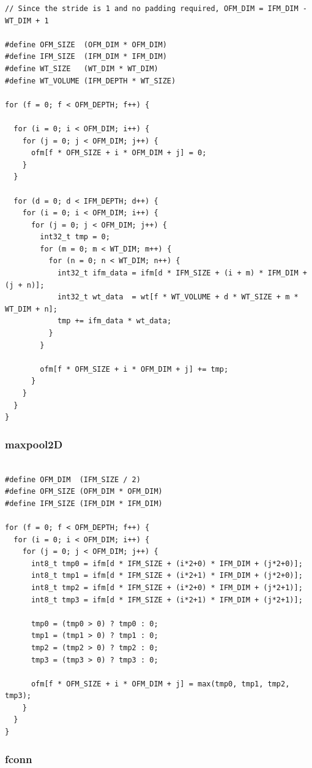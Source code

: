 \documentclass[11pt]{article}
\begin{document}
\begin{verbatim}
// Since the stride is 1 and no padding required, OFM_DIM = IFM_DIM - WT_DIM + 1

#define OFM_SIZE  (OFM_DIM * OFM_DIM)
#define IFM_SIZE  (IFM_DIM * IFM_DIM)
#define WT_SIZE   (WT_DIM * WT_DIM)
#define WT_VOLUME (IFM_DEPTH * WT_SIZE)

for (f = 0; f < OFM_DEPTH; f++) {

  for (i = 0; i < OFM_DIM; i++) {
    for (j = 0; j < OFM_DIM; j++) {
      ofm[f * OFM_SIZE + i * OFM_DIM + j] = 0;
    }
  }

  for (d = 0; d < IFM_DEPTH; d++) {
    for (i = 0; i < OFM_DIM; i++) {
      for (j = 0; j < OFM_DIM; j++) {
        int32_t tmp = 0;
        for (m = 0; m < WT_DIM; m++) {
          for (n = 0; n < WT_DIM; n++) {
            int32_t ifm_data = ifm[d * IFM_SIZE + (i + m) * IFM_DIM + (j + n)];
            int32_t wt_data  = wt[f * WT_VOLUME + d * WT_SIZE + m * WT_DIM + n];
            tmp += ifm_data * wt_data;
          }
        }

        ofm[f * OFM_SIZE + i * OFM_DIM + j] += tmp;
      }
    }
  }
}

\end{verbatim}

\subsubsection{maxpool2D}

\begin{verbatim}

#define OFM_DIM  (IFM_SIZE / 2)
#define OFM_SIZE (OFM_DIM * OFM_DIM)
#define IFM_SIZE (IFM_DIM * IFM_DIM)

for (f = 0; f < OFM_DEPTH; f++) {
  for (i = 0; i < OFM_DIM; i++) {
    for (j = 0; j < OFM_DIM; j++) {
      int8_t tmp0 = ifm[d * IFM_SIZE + (i*2+0) * IFM_DIM + (j*2+0)];
      int8_t tmp1 = ifm[d * IFM_SIZE + (i*2+1) * IFM_DIM + (j*2+0)];
      int8_t tmp2 = ifm[d * IFM_SIZE + (i*2+0) * IFM_DIM + (j*2+1)];
      int8_t tmp3 = ifm[d * IFM_SIZE + (i*2+1) * IFM_DIM + (j*2+1)];

      tmp0 = (tmp0 > 0) ? tmp0 : 0;
      tmp1 = (tmp1 > 0) ? tmp1 : 0;
      tmp2 = (tmp2 > 0) ? tmp2 : 0;
      tmp3 = (tmp3 > 0) ? tmp3 : 0;

      ofm[f * OFM_SIZE + i * OFM_DIM + j] = max(tmp0, tmp1, tmp2, tmp3);
    }
  }
}

\end{verbatim}
\subsubsection{fconn}
\end{document}

